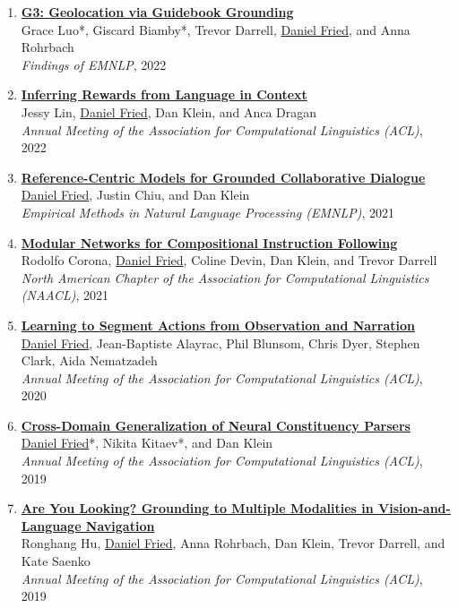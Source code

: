 \begin{enumerate}[leftmargin=-1mm,partopsep=0pt]
\item \href{https://arxiv.org/abs/2211.15521}{\textbf{G3: Geolocation via Guidebook Grounding}} \\
  Grace Luo*, Giscard Biamby*, Trevor Darrell, \underline{Daniel Fried}, and Anna Rohrbach\\
  \emph{Findings of EMNLP}, 2022

\item \href{https://arxiv.org/abs/2204.02515}{\textbf{Inferring Rewards from Language in Context}} \\
  Jessy Lin, \underline{Daniel Fried}, Dan Klein, and Anca Dragan\\
  \emph{Annual Meeting of the Association for Computational Linguistics (ACL)}, 2022

\item \href{https://arxiv.org/abs/2109.05042}{\textbf{Reference-Centric Models for Grounded Collaborative Dialogue}} \\
  \underline{Daniel Fried}, Justin Chiu, and Dan Klein\\
  \emph{Empirical Methods in Natural Language Processing (EMNLP)}, 2021

\item \href{https://arxiv.org/abs/2010.12764}{\textbf{Modular Networks for Compositional Instruction Following}} \\
  Rodolfo Corona, \underline{Daniel Fried}, Coline Devin, Dan Klein, and Trevor Darrell\\
  \emph{North American Chapter of the Association for Computational Linguistics (NAACL)}, 2021

\item \href{https://arxiv.org/abs/2005.03684}{\textbf{Learning to Segment Actions from Observation and Narration}} \\
  \underline{Daniel Fried}, Jean-Baptiste Alayrac, Phil Blunsom, Chris Dyer, Stephen Clark, Aida Nematzadeh\\
  \emph{Annual Meeting of the Association for Computational Linguistics (ACL)}, 2020

\item \href{https://arxiv.org/abs/1907.04347}{\textbf{Cross-Domain Generalization of Neural Constituency Parsers}} \\
  \underline{Daniel Fried}*, Nikita Kitaev*, and Dan Klein\\
  \emph{Annual Meeting of the Association for Computational Linguistics (ACL)}, 2019

\item \href{https://arxiv.org/abs/1906.00347}{\textbf{Are You Looking? Grounding to Multiple Modalities in Vision-and-Language Navigation}} \\
  Ronghang Hu, \underline{Daniel Fried}, Anna Rohrbach, Dan Klein, Trevor Darrell, and Kate Saenko\\
  \emph{Annual Meeting of the Association for Computational Linguistics (ACL)}, 2019


\end{enumerate}
